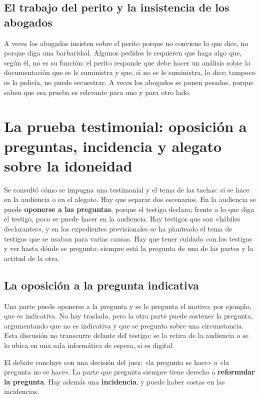 \documentclass[12pt,oneside]{book}
\begin{document}
\subsection{El trabajo del perito y la insistencia de los abogados}

A veces los abogados insisten sobre el perito porque no conviene lo que dice, no porque diga una barbaridad. Algunos pedidos le requieren que haga algo que, según él, no es su función: el perito responde que debe hacer un análisis sobre la documentación que se le suministra y que, si no se le suministra, lo dice; tampoco es la policía, no puede secuestrar. A veces los abogados se ponen pesados, porque saben que esa prueba es relevante para uno y para otro lado.

\section{La prueba testimonial: oposición a preguntas, incidencia y alegato sobre la idoneidad}

Se consultó cómo se impugna una testimonial y el tema de las tachas: si se hace en la audiencia o en el alegato. Hay que separar dos escenarios. En la audiencia se puede \textbf{oponerse a las preguntas}, porque el testigo declara; frente a lo que diga el testigo, poco se puede hacer en la audiencia. Hay testigos que son «hábiles declarantes», y en los expedientes previsionales se ha planteado el tema de testigos que se usaban para varias causas. Hay que tener cuidado con los testigos y ver hasta dónde se pregunta: siempre está la pregunta de una de las partes y la actitud de la otra.

\subsection{La oposición a la pregunta indicativa}

Una parte puede oponerse a la pregunta y se le pregunta el motivo; por ejemplo, que es indicativa. No hay traslado, pero la otra parte puede sostener la pregunta, argumentando que no es indicativa y que se pregunta sobre una circunstancia. Esta discusión no transcurre delante del testigo: se lo retira de la audiencia o se lo ubica en una sala informática de espera, si es digital.

El debate concluye con una decisión del juez: «la pregunta se hace» o «la pregunta no se hace». La parte que pregunta siempre tiene derecho a \textbf{reformular la pregunta}. Hay además una \textbf{incidencia}, y puede haber costas en las incidencias.
\end{document}
